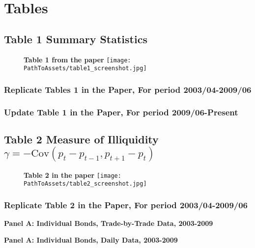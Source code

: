 \documentclass{article}
\newcommand*{\PathToAssets}{../assets}%
\newcommand*{\PathToOutput}{../output/}%
\begin{document}
\section{Tables}

\subsection{Table 1 Summary Statistics}

\begin{figure}[hbt!]
\centering
\textbf{\large Table 1 from the paper}
\texttt{[image: \\PathToAssets/table1\_screenshot.jpg]}
\end{figure}

\subsubsection{Replicate Tables 1 in the Paper, For period 2003/04-2009/06}
\doublespacing

\subsubsection{Update Table 1 in the Paper, For period 2009/06-Present}
\doublespacing


\subsection{Table 2 Measure of Illiquidity $ \gamma = -\text{Cov}(p_t - p_{t-1}, p_{t+1} - p_t) $ }


\begin{figure}[hbt!]
\centering
\textbf{\large Table 2 in the paper}
\texttt{[image: \\PathToAssets/table2\_screenshot.jpg]}
\end{figure}


\subsubsection{Replicate Table 2 in the Paper, For period 2003/04-2009/06}
\doublespacing
\begin{table}[hbt!]
\centering
\textbf{\large Panel A: Individual Bonds, Trade-by-Trade Data, 2003-2009}

\label{table:table2_panelA_trade_by_trade_paper}
\end{table}

\begin{table}[hbt!]
\centering
\textbf{\large Panel A: Individual Bonds, Daily Data, 2003-2009}

\label{table:table2_panelA_daily_paper}
\end{table}
\end{document}
